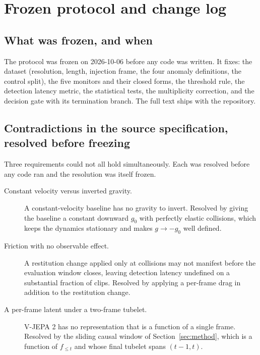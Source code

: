 \section{Frozen protocol and change log}
\label{app:prereg}

\subsection{What was frozen, and when}

The protocol was frozen on 2026-10-06 before any code was written. It fixes:
the dataset (resolution, length, injection frame, the four anomaly definitions,
the control split), the five monitors and their closed forms, the threshold
rule, the detection latency metric, the statistical tests, the multiplicity
correction, and the decision gate with its termination branch. The full text
ships with the repository.

\subsection{Contradictions in the source specification, resolved before freezing}

Three requirements could not all hold simultaneously. Each was resolved before
any code ran and the resolution was itself frozen.

\begin{description}
\item[Constant velocity versus inverted gravity.] A constant-velocity baseline
has no gravity to invert. Resolved by giving the baseline a constant downward
$g_0$ with perfectly elastic collisions, which keeps the dynamics stationary and
makes $g \to -g_0$ well defined.

\item[Friction with no observable effect.] A restitution change applied only at
collisions may not manifest before the evaluation window closes, leaving
detection latency undefined on a substantial fraction of clips. Resolved by applying
a per-frame drag in addition to the restitution change.

\item[A per-frame latent under a two-frame tubelet.] V-JEPA 2 has no
representation that is a function of a single frame. Resolved by the sliding
causal window of Section~\ref{sec:method}, which is a function of $f_{\leq t}$
and whose final tubelet spans $(t{-}1,t)$.
\end{description}

